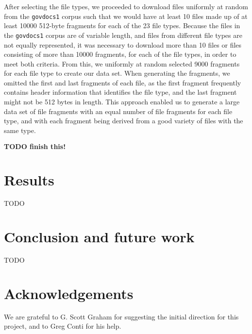 \documentclass[letter,11pt]{article}
\begin{document}
After selecting the file types, we proceeded to download files uniformly at random from the \texttt{govdocs1} corpus such that we would have at least 10 files made up of at least 10000 512-byte fragments for each of the 23 file types. Because the files in the \texttt{govdocs1} corpus are of variable length, and files from different file types are not equally represented, it was necessary to download more than 10 files or files consisting of more than 10000 fragments, for each of the file types, in order to meet both criteria. From this, we uniformly at random selected 9000 fragments for each file type to create our data set. When generating the fragments, we omitted the first and last fragments of each file, as the first fragment frequently contains header information that identifies the file type, and the last fragment might not be 512 bytes in length. This approach enabled us to generate a large data set of file fragments with an equal number of file fragments for each file type, and with each fragment being derived from a good variety of files with the same type.

\textbf{TODO finish this!}

\section{Results}
\label{Section:Results}
TODO

\section{Conclusion and future work}
\label{Section:ConclusionAndFutureWork}
TODO

\section*{Acknowledgements}
We are grateful to G. Scott Graham for suggesting the initial direction for this project, and to Greg Conti for his help.


\newpage


\end{document}
